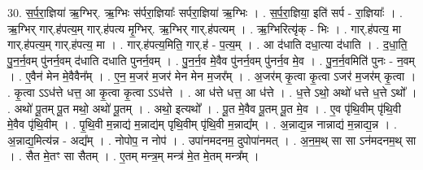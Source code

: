 \documentclass[17pt]{extarticle}
\begin{document}
30. स॒र्प॒रा॒ज्ञिया॑ ऋ॒ग्भिर्. ऋ॒ग्भिः स॑र्परा॒ज्ञियाः᳚ सर्परा॒ज्ञिया॑ ऋ॒ग्भिः । . स॒र्प॒रा॒ज्ञिया॒ इति॑ सर्प - रा॒ज्ञियाः᳚ । . ऋ॒ग्भिर् गार्.ह॑पत्य॒म् गार्.ह॑पत्य मृ॒ग्भिर्. ऋ॒ग्भिर् गार्.ह॑पत्यम् । . ऋ॒ग्भिरित्यृ॑क् - भिः । . गार्.ह॑पत्य॒ मा गार्.ह॑पत्य॒म् गार्.ह॑पत्य॒ मा । . गार्.ह॑पत्य॒मिति॒ गार्.ह॑ - प॒त्य॒म् । . आ द॑धाति दधा॒त्या द॑धाति । . द॒धा॒ति॒ पु॒न॒र्न॒वम् पु॑नर्न॒वम् द॑धाति दधाति पुनर्न॒वम् । . पु॒न॒र्न॒व मे॒वैव पु॑नर्न॒वम् पु॑नर्न॒व मे॒व । . पु॒न॒र्न॒वमिति॑ पुनः - न॒वम् । . ए॒वैन॑ मेन मे॒वैवैन᳚म् । . ए॒न॒ म॒जर॑ म॒जर॑ मेन मेन म॒जर᳚म् । . अ॒जर॑म् कृ॒त्वा कृ॒त्वा ऽजर॑ म॒जर॑म् कृ॒त्वा । . कृ॒त्वा ऽऽध॑त्ते धत्त॒ आ कृ॒त्वा कृ॒त्वा ऽऽध॑त्ते । . आ ध॑त्ते धत्त॒ आ ध॑त्ते । . ध॒त्ते ऽथो॒ अथो॑ धत्ते ध॒त्ते ऽथो᳚ । . अथो॑ पू॒तम् पू॒त मथो॒ अथो॑ पू॒तम् । . अथो॒ इत्यथो᳚ । . पू॒त मे॒वैव पू॒तम् पू॒त मे॒व । . ए॒व पृ॑थि॒वीम् पृ॑थि॒वी मे॒वैव पृ॑थि॒वीम् । . पृ॒थि॒वी म॒न्नाद्य॑ म॒न्नाद्य॑म् पृथि॒वीम् पृ॑थि॒वी म॒न्नाद्य᳚म् । . अ॒न्नाद्य॒न्न नान्नाद्य॑ म॒न्नाद्य॒न्न । . अ॒न्नाद्य॒मित्य॑न्न - अद्य᳚म् । . नोपोप॒ न नोप॑ । . उपा॑नमदनम॒ दुपोपा॑नमत् । . अ॒न॒म॒थ् सा सा ऽन॑मदनम॒थ् सा । . सैत मे॒तꣳ सा सैतम् । . ए॒तम् मन्त्र॒म् मन्त्र॑ मे॒त मे॒तम् मन्त्र᳚म् । \newline
\end{document}
